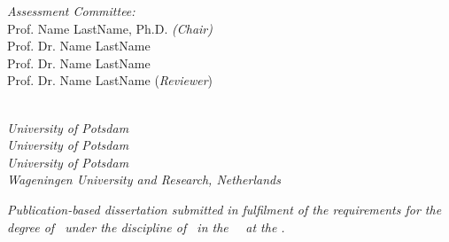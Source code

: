 \documentclass[
11pt, %
english, %
singlespacing, %
headsepline, %
onecolumn
]{MastersDoctoralThesis} %
\begin{document}
\begin{committee}
\begin{center}
\vfill

\vfill

\begin{minipage}[t]{0.47\textwidth}
\begin{flushleft} \large
\emph{Assessment Committee:}\\
\vspace{\baselineskip}
Prof. Name LastName, Ph.D. \textit{(Chair)}\\
\vspace{\baselineskip}
Prof. Dr. Name LastName\\
\vspace{\baselineskip} 
Prof. Dr. Name LastName\\
\vspace{\baselineskip} 
Prof. Dr. Name LastName (\textit{Reviewer})\\

\end{flushleft}
\end{minipage}
\begin{minipage}[t]{0.52\textwidth}
\begin{flushright} \large
\emph{} \\
\vspace{\baselineskip}
\textit{University of Potsdam}\\
\vspace{\baselineskip}
\textit{University of Potsdam}\\ 
\vspace{\baselineskip} 
\textit{University of Potsdam}\\
\vspace{\baselineskip} 
\textit{Wageningen University and Research, Netherlands}\\

\end{flushright}
\end{minipage}

\end{center}
 
\vfill
\noindent
\large \textit{Publication-based dissertation submitted in fulfilment of the requirements for the degree of \degreename\ under the discipline of \groupname\ in the \deptname\, \facname\ at the \univname.}
 

\end{committee}

\end{document}
